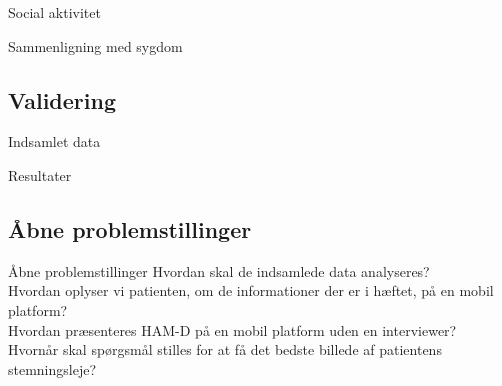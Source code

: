 \begin{frame}{Social aktivitet}
\end{frame}

\begin{frame}{Sammenligning med sygdom}
\end{frame}

\subsection{Validering}
\begin{frame}{Indsamlet data}
\end{frame}
\begin{frame}{Resultater}
\end{frame}

\subsection{Åbne problemstillinger}
\begin{frame}{Åbne problemstillinger}
Hvordan skal de indsamlede data analyseres?\\
Hvordan oplyser vi patienten, om de informationer der er i hæftet, på en mobil platform?\\
Hvordan præsenteres HAM-D på en mobil platform uden en interviewer?\\
Hvornår skal spørgsmål stilles for at få det bedste billede af patientens stemningsleje?\\

\end{frame}
